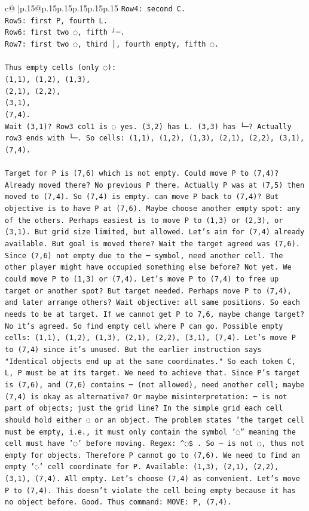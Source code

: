 \documentclass{article}
\begin{document}
{\begin{supertabular}{c@{$\;$}|p{.15\linewidth}@{}p{.15\linewidth}p{.15\linewidth}p{.15\linewidth}p{.15\linewidth}p{.15\linewidth}}
{{{\texttt{Row4: second C.} \\
\texttt{Row5: first P, fourth L.} \\
\texttt{Row6: first two ◌, fifth ┘─.} \\
\texttt{Row7: first two ◌, third │, fourth empty, fifth ◌.} \\
\\ 
\texttt{Thus empty cells (only ◌): } \\
\texttt{(1,1), (1,2), (1,3),} \\
\texttt{(2,1), (2,2),} \\
\texttt{(3,1),} \\
\texttt{(7,4).} \\
\texttt{Wait (3,1)? Row3 col1 is ◌ yes. (3,2) has L. (3,3) has └─? Actually row3 ends with └─. So cells: (1,1), (1,2), (1,3), (2,1), (2,2), (3,1), (7,4). } \\
\\ 
\texttt{Target for P is (7,6) which is not empty. Could move P to (7,4)? Already moved there? No previous P there. Actually P was at (7,5) then moved to (7,4). So (7,4) is empty. can move P back to (7,4)? But objective is to have P at (7,6). Maybe choose another empty spot: any of the others. Perhaps easiest is to move P to (1,3) or (2,3), or (3,1). But grid size limited, but allowed. Let's aim for (7,4) already available. But goal is moved there? Wait the target agreed was (7,6). Since (7,6) not empty due to the ─ symbol, need another cell. The other player might have occupied something else before? Not yet. We could move P to (1,3) or (7,4). Let's move P to (7,4) to free up target or another spot? But target needed. Perhaps move P to (7,4), and later arrange others? Wait objective: all same positions. So each needs to be at target. If we cannot get P to 7,6, maybe change target? No it's agreed. So find empty cell where P can go. Possible empty cells: (1,1), (1,2), (1,3), (2,1), (2,2), (3,1), (7,4). Let's move P to (7,4) since it's unused. But the earlier instruction says "Identical objects end up at the same coordinates." So each token C, L, P must be at its target. We need to achieve that. Since P's target is (7,6), and (7,6) contains ─ (not allowed), need another cell; maybe (7,4) is okay as alternative? Or maybe misinterpretation: ─ is not part of objects; just the grid line? In the simple grid each cell should hold either ◌ or an object. The problem states 'the target cell must be empty, i.e., it must only contain the symbol '◌'' meaning the cell must have '◌' before moving. Regex: \^{}◌\$ . So ─ is not ◌, thus not empty for objects. Therefore P cannot go to (7,6). We need to find an empty '◌' cell coordinate for P. Available: (1,3), (2,1), (2,2), (3,1), (7,4). All empty. Let's choose (7,4) as convenient. Let's move P to (7,4). This doesn't violate the cell being empty because it has no object before. Good. Thus command: MOVE: P, (7,4).} \\
            }
        }
    }
     \\ \\


\end{supertabular}}
\end{document}
